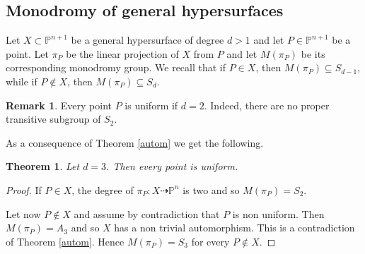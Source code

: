 \documentclass[12pt,a4paper,twoside,leqno,noamsfonts]{amsart}
\newtheorem{lem}[cor]{Lemma}
\newtheorem{thm}[cor]{Theorem}
\theoremstyle{definition}
\newtheorem{rmk}[cor]{Remark}
\newcommand{\bP}{\mathbb{P}}
\newcommand{\cX}{\mathcal{X}}
\begin{document}
\begin{comment}
Let $P \in \bP^{n+1}$ be a point and $\bP^n$ an hyperplane not containing $P$ and consider  
\begin{equation*}
    \xymatrix{
    \widetilde{\bP^{n+1}} \ar[d]^\nu \ar[dr]^{\widetilde{\pi_P}} & \\
    \bP^{n+1} \ar@{-->}[r]^{\pi_P} & \bP^n
    }
\end{equation*}
where $\nu$ is the blow up the projective space at $P$ and $\pi_P$ is the projection of $\bP^{n+1}$ form $P$. Let $X \subset \bP^{n+1}$ be a general hypersurface of degree $d$ and let $\pi_s: X \dashrightarrow \bP^n$, the restriction of $\pi_P$ to $X$. 

Let $\cX$ be a smooth family of hypersurfaces in $\bP^{n+1}$ of degree $d \geq 3$ parametrized by a disc $\Delta$, whose general member is a general hypersurface. Let $X_0$ be a general hypersurface $Y$ of degree $d-1$ and a hyperplane $H$. 

\begin{lem}\label{induction}
Let $P \in \bP^{n+1}$. Then, the monodromy group $M(\pi_0)$ is contained in the monodromy group $M(\pi_s)$ for a general $s \in \Delta$.
\end{lem}

\begin{proof}
The variety $\Tilde{X_0}$, the blow up of $X_0$ at $P$, has at least one non reduced irreducible component. Hence we can apply Lemma \ref{lemmagenerale} and conclude that $M(\pi_0) \subset M(\pi_s)$.
\end{proof}
\end{comment}


\medskip

\subsection{Monodromy of general hypersurfaces}
Let $X \subset \bP^{n+1}$ be a general hypersurface of degree $d >1$ and let $P \in \bP^{n+1}$ be a point. Let $\pi_P$ be the linear projection of $X$ from $P$ and let $M(\pi_P)$ be its corresponding monodromy group. We recall that if $P \in X$, then $M(\pi_P) \subseteq S_{d-1}$, while if $P \notin X$, then $M(\pi_P)\subseteq S_d$. 

\begin{rmk}\label{d2}
Every point $P$ is uniform if $d=2$. Indeed, there are no proper transitive subgroup of $S_2$.
\end{rmk}

As a consequence of Theorem \ref{autom} we get the following.
\begin{thm}\label{d3}
Let $d=3$. Then every point is uniform.
\end{thm}
\begin{proof}
If $P \in X$, the degree of $\pi_P: X \dashrightarrow \bP^n$ is two and so $M(\pi_P)=S_2$. 

Let now $P \notin X$ and assume by contradiction that $P$ is non uniform. Then $M(\pi_P)=A_3$ and so $X$ has a non trivial automorphism. This is a contradiction of Theorem \ref{autom}. Hence $M(\pi_P)=S_3$ for every $P \notin X$. 
\end{proof}
\end{document}

